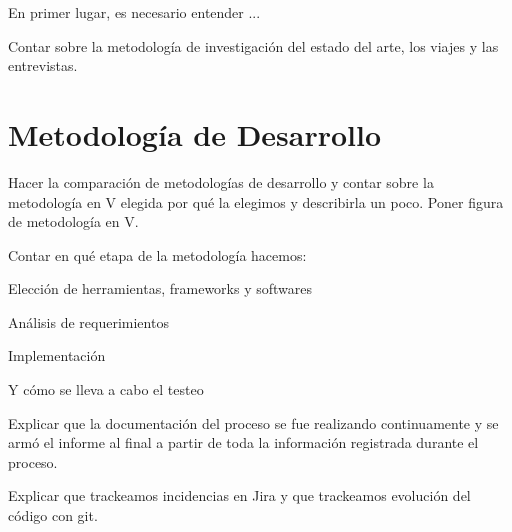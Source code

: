 En primer lugar, es necesario entender ...

Contar sobre la metodología de investigación del estado del arte, los viajes y las entrevistas.

\section{Metodología de Desarrollo}
\label{sec:software-method}

Hacer la comparación de metodologías de desarrollo y contar sobre la metodología en V elegida por qué la elegimos y describirla un poco. Poner figura de metodología en V.

Contar en qué etapa de la metodología hacemos:

Elección de herramientas, frameworks y softwares

Análisis de requerimientos

Implementación

Y cómo se lleva a cabo el testeo

Explicar que la documentación del proceso se fue realizando continuamente y se armó el informe al final a partir de toda la información registrada durante el proceso.

Explicar que trackeamos incidencias en Jira y que trackeamos evolución del código con git.
